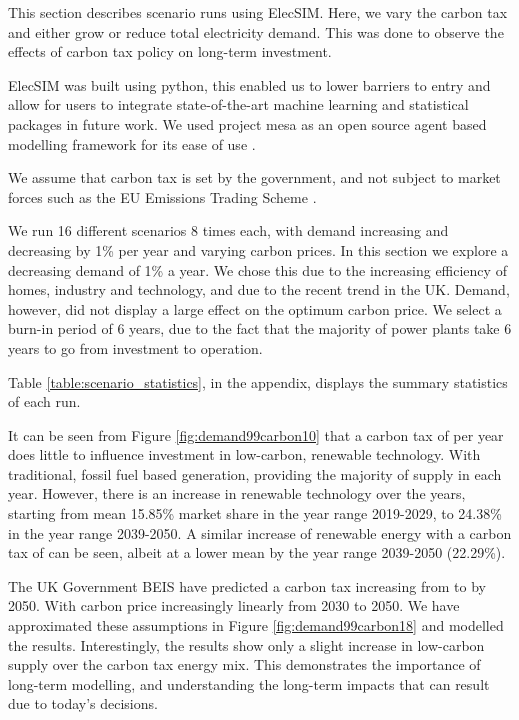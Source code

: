 
This section describes scenario runs using ElecSIM. Here, we vary the carbon tax and either grow or reduce total electricity demand. This was done to observe the effects of carbon tax policy on long-term investment.

ElecSIM was built using python, this enabled us to lower barriers to entry and allow for users to integrate state-of-the-art machine learning and statistical packages in future work. We used project mesa as an open source agent based modelling framework for its ease of use \cite{Masad2015}.

We assume that carbon tax is set by the government, and not subject to market forces such as the EU Emissions Trading Scheme \cite{Council2016}.

We run 16 different scenarios 8 times each, with demand increasing and decreasing by 1\% per year and  varying carbon prices. In this section we explore a decreasing demand of 1\% a year. We chose this due to the increasing efficiency of homes, industry and technology, and due to the recent trend in the UK. Demand, however, did not display a large effect on the optimum carbon price. We select a burn-in period of 6 years, due to the fact that the majority of power plants take 6 years to go from investment to operation.

Table \ref{table:scenario_statistics}, in the appendix, displays the summary statistics of each run.

It can be seen from Figure \ref{fig:demand99carbon10} that a carbon tax of  per year does little to influence investment in low-carbon, renewable technology. With traditional, fossil fuel based generation, providing the majority of supply in each year. However, there is an increase in renewable technology over the years, starting from mean 15.85\% market share in the year range 2019-2029, to 24.38\% in the year range 2039-2050. A similar increase of renewable energy with a carbon tax of  can be seen, albeit at a lower mean by the year range 2039-2050 (22.29\%).

The UK Government BEIS have predicted a carbon tax increasing from  to  by 2050. With carbon price increasingly linearly from 2030 to 2050. We have approximated these assumptions in Figure \ref{fig:demand99carbon18} and modelled the results. Interestingly, the results show only a slight increase in low-carbon supply over the  carbon tax energy mix. This demonstrates the importance of long-term modelling, and understanding the long-term impacts that can result due to today's decisions.

